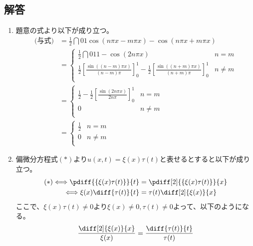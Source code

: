 \documentclass[dvipdfmx,titlepage, 11pt, a4paper]{jsarticle}%
\begin{document}
\subsection{解答}
\begin{enumerate}[(1)]
    \item 題意の式より以下が成り立つ。
        \begin{align*}
            \mbox{(与式)} 
            & = \frac{1}{2}\dint{0}{1}{\cos (n\pi x - m\pi x) - \cos (n\pi x + m\pi x)}\\
            & = 
            \begin{cases}
                \frac{1}{2}\dint{0}{1}{1 - \cos (2n\pi x)} & n = m\\
                \frac{1}{2}\left[\frac{\sin ((n - m)\pi x)}{(n - m)\pi}\right]_{0}^{1} - \frac{1}{2}\left[\frac{\sin ((n + m)\pi x)}{(n + m)\pi}\right]_{0}^{1} & n \neq m\\
            \end{cases}\\
            & = 
            \begin{cases}
                \frac{1}{2} - \frac{1}{2}\left[\frac{\sin (2n\pi x)}{2n\pi}\right]_{0}^{1} & n = m\\
                0 & n \neq m\\
            \end{cases}\\
            & = 
            \begin{cases}
                \frac{1}{2} & n = m\\
                0 & n \neq m\\
            \end{cases}
        \end{align*}
    \item 偏微分方程式$(*)$より$u(x, t) = \xi (x)\tau (t)$と表せるとすると以下が成り立つ。
        \begin{align*}
            (*) \Longleftrightarrow
            \pdiff{\{\xi (x)\tau (t)\}}{t} & = \pdiff[2]{\{\xi (x)\tau (t)\}}{x}\\
            \Longleftrightarrow
            \xi (x)\diff{\tau (t)}{t} & = \tau (t)\diff[2]{\xi (x)}{x}
        \end{align*}
        ここで、$\xi (x)\tau(t) \neq 0$より$\xi (x) \neq 0, \tau (t) \neq 0$よって、以下のようになる。
        \begin{align*}
            \frac{\diff[2]{\xi (x)}{x}}{\xi (x)} &= \frac{\diff{\tau (t)}{t}}{\tau (t)}\\

\end{align*}
\end{enumerate}
\end{document}
